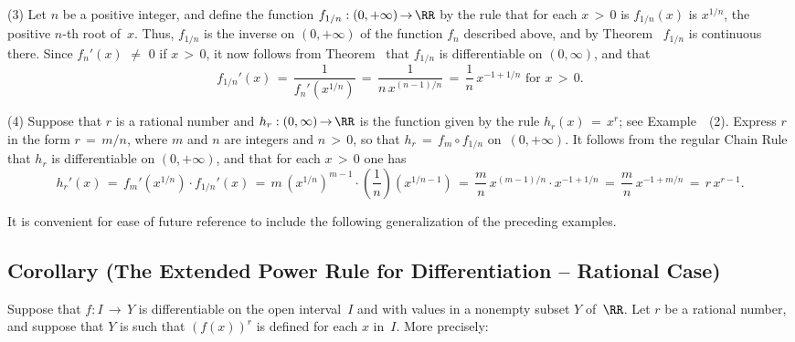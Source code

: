 \V

        (3) Let $n$ be a positive integer, and define the function $f_{1/n}:(0,+{\infty}) \,{\rightarrow}\, {\RR}$
    by the rule that for each $x\,>\,0$ is $f_{1/n}(x)$ is $x^{1/n}$, the positive $n$-th root of~$x$.
    Thus, $f_{1/n}$ is the inverse on $(0,+{\infty})$ of the function $f_{n}$ described above, and by Theorem~ $f_{1/n}$ is continuous there.
    Since $f_{n}'(x) \,\,{\neq}\,\, 0$ if $x\,>\,0$, it now follows from Theorem~ that $f_{1/n}$ is differentiable on $(0,{\infty})$,
    and that
        \begin{displaymath}
        f_{1/n}'(x) \,=\, \frac{1}{f_{n}'(x^{1/n})} \,=\, 
        \frac{1}{n\,x^{(n-1)/n}} \,=\, \frac{1}{n}\,x^{-1+1/n} \mbox{ for $x\,>\,0$}.
        \end{displaymath}

\V

        (4) Suppose that $r$ is a rational number and $h_{r}:(0,{\infty}) \,{\rightarrow}\, {\RR}$
    is the function given by the rule $h_{r}(x) \,=\, x^{r}$; see Example~~(2).
    Express $r$ in the form $r \,=\, m/n$, where $m$ and $n$ are integers and $n\,>\,0$, so that $h_{r} \,=\, f_{m}{\circ}f_{1/n}$ on~$(0,+{\infty})$.
    It follows from the regular Chain Rule that $h_{r}$ is differentiable on $(0,+{\infty})$, and that for each $x\,>\,0$ one has
        \begin{displaymath}
        h_{r}'(x) \,=\, f_{m}'(x^{1/n}){\cdot}f_{1/n}'(x)
     \,=\, 
        m\,(x^{1/n})^{m-1}{\cdot}\left(\frac{1}{n}\right)(x^{1/n -1})
     \,=\, 
        \frac{m}{n}\,x^{(m-1)/n}{\cdot}x^{-1+1/n}
     \,=\, 
        \frac{m}{n}\,x^{-1+m/n}
     \,=\, 
        r\,x^{r-1}.
        \end{displaymath}

\VV

        It is convenient for ease of future reference to include the following generalization of the preceding examples.

\V

             \subsection{\small{\bf Corollary} (The Extended Power Rule for Differentiation -- Rational Case)}
            \label{CorE40.130}

\V

        Suppose that $f:I \,{\rightarrow}\,Y$ is differentiable on the open interval~$I$ and with values in a nonempty subset $Y$ of~${\RR}$.
    Let $r$ be a rational number, and suppose that $Y$ is such that $(f(x))^{r}$ is defined for each $x$ in~$I$.
    More precisely:

